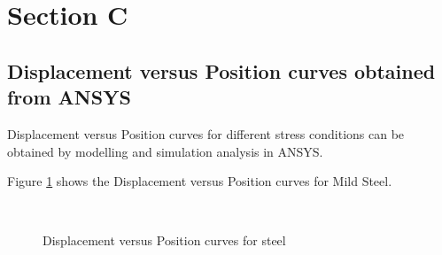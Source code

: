 \section{Section C}
\subsection{Displacement versus Position curves obtained from ANSYS}
Displacement versus Position curves for different stress conditions can be obtained by modelling and simulation analysis in ANSYS.

Figure \ref{F 3.1} shows the Displacement versus Position curves for Mild Steel.
\begin{figure}[htp]
	\centering
	\\ %
	\centering
	\caption{Displacement versus Position curves for steel} %
	\label{F 3.1}
\end{figure}
